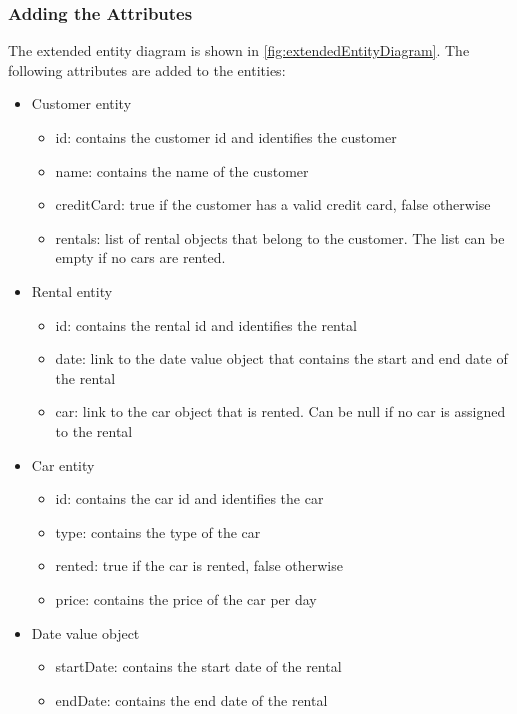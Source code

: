 \subsubsection*{Adding the Attributes}
The extended entity diagram is shown in \autoref{fig:extendedEntityDiagram}.
The following attributes are added to the entities:
\begin{itemize}
    \item Customer entity
    \begin{itemize}
        \item id: contains the customer id and identifies the customer
        \item name: contains the name of the customer
        \item creditCard: true if the customer has a valid credit card, false otherwise
        \item rentals: list of rental objects that belong to the customer. The list can be empty if no cars are rented.
    \end{itemize}
    \item Rental entity
    \begin{itemize}
        \item id: contains the rental id and identifies the rental
        \item date: link to the date value object that contains the start and end date of the rental
        \item car: link to the car object that is rented. Can be null if no car is assigned to the rental
    \end{itemize}
    \item Car entity
    \begin{itemize}
        \item id: contains the car id and identifies the car
        \item type: contains the type of the car
        \item rented: true if the car is rented, false otherwise
        \item price: contains the price of the car per day
    \end{itemize}
    \item Date value object
    \begin{itemize}
        \item startDate: contains the start date of the rental
        \item endDate: contains the end date of the rental
    \end{itemize}
\end{itemize}

